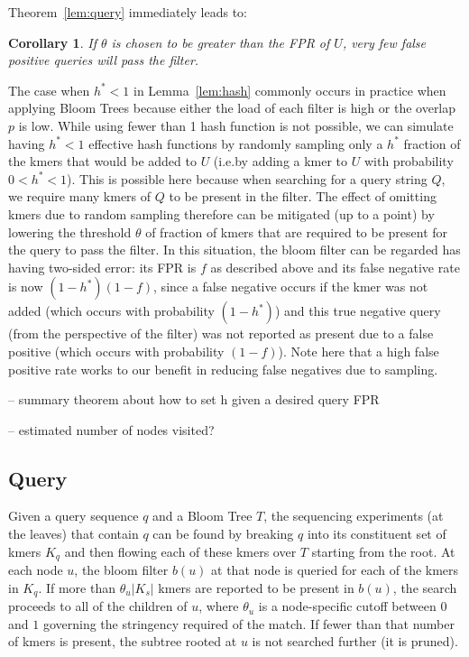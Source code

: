 \documentclass[11pt]{article}
\newtheorem{cor}{Corollary}
\begin{document}
Theorem~\ref{lem:query} immediately leads to:
\begin{cor}
If $\theta$ is chosen to be greater than the FPR of $U$, very few false positive queries will pass the filter.
\end{cor}


The case when $h^* < 1$  in Lemma~\ref{lem:hash} commonly occurs in practice when applying Bloom Trees because either the load of each filter is high or the overlap $p$ is low. While using fewer than 1 hash function is not possible, we can simulate having $h^* < 1$ effective hash functions  by randomly sampling only a $h^*$ fraction of the kmers that would be added to $U$ (i.e.\@ by adding a kmer to $U$ with probability $0 < h^* < 1$). This is possible here because when searching for a query string $Q$, we require many kmers of $Q$ to be present in the filter. The effect of omitting kmers due to random sampling therefore can be mitigated (up to a point) by lowering the  threshold $\theta$ of fraction of kmers that are required to be present  for the query to pass the filter.  In this situation, the bloom filter can be regarded has having two-sided error: its FPR is $f$ as described above and its false negative rate is now $(1-h^*)(1-f)$, since a false negative occurs if the kmer was not added (which occurs with probability $(1-h^*)$) and this true negative query (from the perspective of the filter) was not reported as present due to a false positive (which occurs with probability $(1-f)$). Note here that a high false positive rate works to our benefit in reducing false negatives due to sampling. 

-- summary theorem about how to set h given a desired query FPR


-- estimated number of nodes visited?



\subsection{Query}

Given a query sequence $q$ and a Bloom Tree $T$, the sequencing experiments (at the leaves) that contain $q$ can be found by breaking $q$ into its constituent set of kmers $K_q$ and then flowing each of these kmers over $T$ starting from the root. At each node $u$, the bloom filter $b(u)$ at that node is queried for each of the kmers in $K_q$. If more than $\theta_u|K_s|$ kmers are reported to be present in $b(u)$, the search proceeds to all of the children of $u$, where $\theta_u$ is a node-specific cutoff between $0$ and $1$ governing the stringency required of the match. If fewer than that number of kmers is present, the subtree rooted at $u$ is not searched further (it is pruned). 
\end{document}
